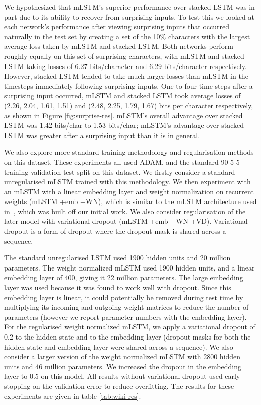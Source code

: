 \documentclass{article}
\begin{document}
We hypothesized that mLSTM's superior performance over stacked LSTM was in part due to its ability to recover from surprising inputs. To test this we looked at each network's performance after viewing surprising inputs that occurred naturally in the test set by creating a set of the 10\% characters with the largest average loss taken by mLSTM and stacked LSTM. Both networks perform roughly equally on this set of surprising characters, with mLSTM and stacked LSTM taking losses of 6.27 bits/character and 6.29 bits/character respectively. However, stacked LSTM tended to take much larger losses than mLSTM in the timesteps immediately following surprising inputs. One to four time-steps after a surprising input occurred, mLSTM and stacked LSTM took average losses of (2.26, 2.04, 1.61, 1.51) and (2.48, 2.25, 1.79, 1.67) bits per character respectively, as shown in Figure \ref{fig:surprise-res}. mLSTM's overall advantage over stacked LSTM was 1.42 bits/char to 1.53 bits/char; mLSTM's advantage over stacked LSTM was greater after a surprising input than it is in general. 

We also explore more standard training methodology and regularisation methods on this dataset. These experiments all used ADAM, and the standard 90-5-5 training validation test split on this dataset. We firstly consider a standard unregularised mLSTM trained with this methodology. We then experiment with an mLSTM with a linear embedding layer and weight normalization \citep{salimans2016} on recurrent weights (mLSTM +emb +WN), which is similar to the mLSTM architecture used in~\citep{radford2017}, which was built off our initial work. We also consider regularisation of the later model with variational dropout \citep{gal2016} (mLSTM +emb +WN +VD). Variational dropout is a form of dropout \citep{srivastava2014} where the dropout mask is shared across a sequence.

The standard unregularised LSTM used 1900 hidden units and 20 million parameters. The weight normalized mLSTM used 1900 hidden units, and a linear embedding layer of 400, giving it 22 million parameters. The large embedding layer was used because it was found to work well with dropout. Since this embedding layer is linear, it could potentially be removed during test time by multiplying its incoming and outgoing weight matrices to reduce the number of parameters (however we report parameter numbers with the embedding layer). For the regularised weight normalized mLSTM, we apply a variational dropout of 0.2 to the hidden state and to the embedding layer (dropout masks for both the hidden state and embedding layer were shared across a sequence). We also consider a larger version of the weight normalized mLSTM with 2800 hidden units and 46 million parameters. We increased the dropout in the embedding layer to 0.5 on this model. All results without variational dropout used early stopping on the validation error to reduce overfitting. The results for these experiments are given in table \ref{tab:wiki-res}.
 
\end{document}
